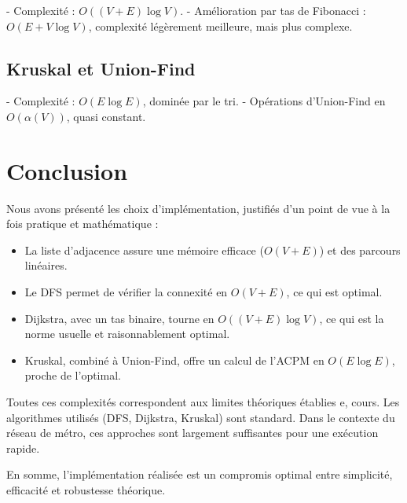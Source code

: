 \documentclass[a4paper,12pt]{article}
\begin{document}
- Complexité : $O((V+E)\log V)$.
- Amélioration par tas de Fibonacci : $O(E + V\log V)$, complexité légèrement meilleure, mais plus complexe.

\subsection{Kruskal et Union-Find}

- Complexité : $O(E \log E)$, dominée par le tri.
- Opérations d’Union-Find en $O(\alpha(V))$, quasi constant.


\section{Conclusion}

Nous avons présenté les choix d’implémentation, justifiés d’un point de vue à la fois pratique et mathématique :

\begin{itemize}
    \item La liste d’adjacence assure une mémoire efficace ($O(V+E)$) et des parcours linéaires.
    \item Le DFS permet de vérifier la connexité en $O(V+E)$, ce qui est optimal.
    \item Dijkstra, avec un tas binaire, tourne en $O((V+E)\log V)$, ce qui est la norme usuelle et raisonnablement optimal.
    \item Kruskal, combiné à Union-Find, offre un calcul de l’ACPM en $O(E \log E)$, proche de l’optimal.
\end{itemize}

Toutes ces complexités correspondent aux limites théoriques établies e, cours. Les algorithmes utilisés (DFS, Dijkstra, Kruskal) sont standard. Dans le contexte du réseau de métro, ces approches sont largement suffisantes pour une exécution rapide.

En somme, l’implémentation réalisée est un compromis optimal entre simplicité, efficacité et robustesse théorique.
\end{document}
